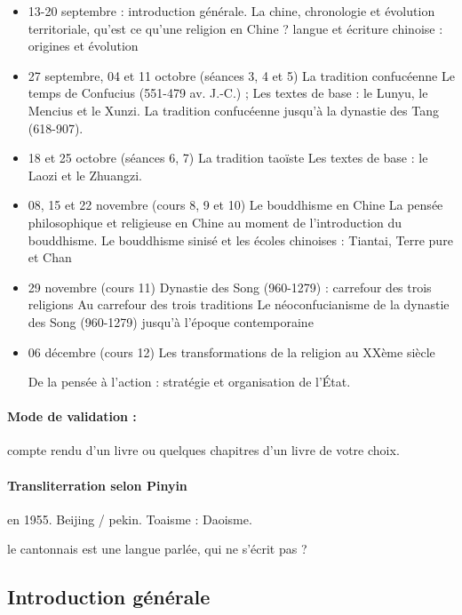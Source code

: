\begin{itemize}
    \item 13-20 septembre : introduction générale. La chine, chronologie et évolution territoriale, qu'est ce qu'une religion en Chine ? langue et écriture chinoise : origines et évolution

\item	27 septembre, 04 et 11 octobre (séances 3, 4 et 5) La tradition confucéenne
Le temps de Confucius (551-479 av. J.-C.) ;
Les textes de base : le Lunyu, le Mencius et le Xunzi.
La tradition confucéenne jusqu’à la dynastie des Tang (618-907).
\item 	18 et 25 octobre (séances 6, 7) La tradition taoïste
Les textes de base : le Laozi et le Zhuangzi.

\item 	08, 15 et 22 novembre (cours 8, 9 et 10) Le bouddhisme en Chine
La pensée philosophique et religieuse en Chine au moment de l’introduction du bouddhisme.
Le bouddhisme sinisé et les écoles chinoises : Tiantai, Terre pure et Chan

\item 	29 novembre (cours 11) Dynastie des Song (960-1279) : carrefour des trois religions
Au carrefour des trois traditions
Le néoconfucianisme de la dynastie des Song (960-1279) jusqu’à l’époque contemporaine

\item 		06 décembre (cours 12)
Les transformations de la religion au XXème siècle

De la pensée à l’action : stratégie et organisation de l’État.
 
\end{itemize}
\paragraph{Mode de validation : } compte rendu d'un livre ou quelques chapitres d'un livre de votre choix. 


\paragraph{Transliterration selon Pinyin} en 1955. Beijing / pekin. 
Toaisme : Daoisme.

\begin{singlequote}
    le cantonnais est une langue parlée, qui ne s'écrit pas ? 
\end{singlequote}

\subsection{Introduction générale}


